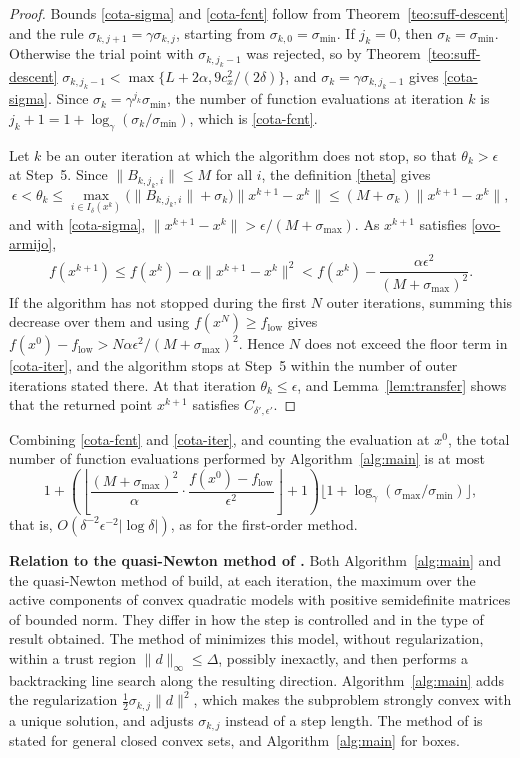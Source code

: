 \documentclass[11pt]{article}
\newcommand{\flow}{f_{\mathrm{low}}}
\newcounter{alg}[section]
\begin{document}
\begin{proof}
Bounds \eqref{cota-sigma} and \eqref{cota-fcnt} follow from
Theorem~\ref{teo:suff-descent} and the rule
$\sigma_{k,j+1} = \gamma\sigma_{k,j}$, starting from
$\sigma_{k,0} = \sigma_{\min}$. If $j_k = 0$, then
$\sigma_k = \sigma_{\min}$. Otherwise the trial point with
$\sigma_{k,j_k-1}$ was rejected, so by Theorem~\ref{teo:suff-descent}
$\sigma_{k,j_k-1} < \max\{L + 2\alpha, 9c_x^2/(2\delta)\}$, and
$\sigma_k = \gamma\sigma_{k,j_k-1}$ gives \eqref{cota-sigma}. Since
$\sigma_k = \gamma^{j_k}\sigma_{\min}$, the number of function evaluations at
iteration $k$ is $j_k + 1 = 1 + \log_\gamma(\sigma_k/\sigma_{\min})$, which is
\eqref{cota-fcnt}.

Let $k$ be an outer iteration at which the algorithm does not stop, so that
$\theta_k > \epsilon$ at Step~5. Since $\|B_{k,j_k,i}\| \leq M$ for all $i$,
the definition \eqref{theta} gives
\[
\epsilon < \theta_k
\leq \max_{i \in I_\delta(x^k)} \big( \|B_{k,j_k,i}\| + \sigma_k \big)
\|x^{k+1} - x^k\|
\leq (M + \sigma_k) \|x^{k+1} - x^k\|,
\]
and with \eqref{cota-sigma},
$\|x^{k+1} - x^k\| > \epsilon / ( M + \sigma_{\max} )$.
As $x^{k+1}$ satisfies \eqref{ovo-armijo},
\[
f(x^{k+1}) \leq f(x^k) - \alpha\|x^{k+1} - x^k\|^2
< f(x^k) - \frac{\alpha\epsilon^2}
{( M + \sigma_{\max} )^2}.
\]
If the algorithm has not stopped during the first $N$ outer iterations, summing
this decrease over them and using $f(x^N) \geq \flow$ gives
$f(x^0) - \flow > N \alpha\epsilon^2 /
( M + \sigma_{\max} )^2$. Hence $N$ does
not exceed the floor term in \eqref{cota-iter}, and the algorithm stops at
Step~5 within the number of outer iterations stated there. At that iteration
$\theta_k \leq \epsilon$, and Lemma~\ref{lem:transfer} shows that the returned
point $x^{k+1}$ satisfies $C_{\delta',\epsilon'}$.
\end{proof}

Combining \eqref{cota-fcnt} and \eqref{cota-iter}, and counting the evaluation
at $x^0$, the total number of function evaluations performed by
Algorithm~\ref{alg:main} is at most
\[
1 + \left( \left\lfloor \frac{(M + \sigma_{\max})^2}{\alpha}
\cdot \frac{f(x^0) - \flow}{\epsilon^2} \right\rfloor + 1 \right)
\big\lfloor 1 + \log_\gamma(\sigma_{\max}/\sigma_{\min}) \big\rfloor,
\]
that is, $O(\delta^{-2}\epsilon^{-2}|\log\delta|)$, as for the first-order method.

\medskip
\noindent\textbf{Relation to the quasi-Newton method of \cite{yano1}.}
Both Algorithm~\ref{alg:main} and the quasi-Newton method of \cite{yano1}
build, at each iteration, the maximum over the active components of convex
quadratic models with positive semidefinite matrices of bounded norm. They
differ in how the step is controlled and in the type of result obtained. The
method of \cite{yano1} minimizes this model, without regularization, within a
trust region $\|d\|_\infty \le \Delta$, possibly inexactly, and then performs a
backtracking line search along the resulting direction. Algorithm~\ref{alg:main}
adds the regularization $\tfrac{1}{2}\sigma_{k,j}\|d\|^2$, which makes the
subproblem strongly convex with a unique solution, and adjusts $\sigma_{k,j}$
instead of a step length. The method of \cite{yano1} is stated for general
closed convex sets, and Algorithm~\ref{alg:main} for boxes.
\end{document}
